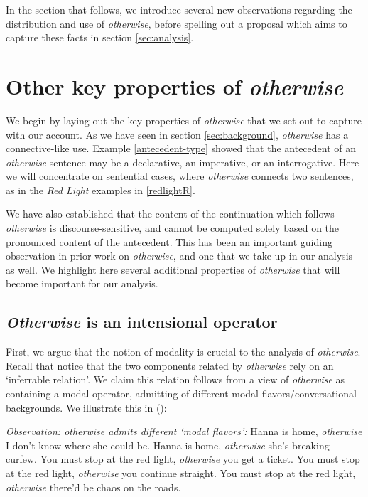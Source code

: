 In the section that follows, we introduce several new observations regarding the distribution and use of \textit{otherwise}, before spelling out a proposal which aims to capture these facts in section \ref{sec:analysis}. 



\section{Other key properties of \textit{otherwise}}
\label{sec:desiderata}


We begin by laying out the key properties of \textit{otherwise} that we set out to capture with our account. As we have seen in section \ref{sec:background}, \textit{otherwise} has a connective-like use. Example \ref{antecedent-type} showed that the antecedent of an \textit{otherwise} sentence may be a declarative, an imperative, or an interrogative. Here we will concentrate on sentential cases, where \textit{otherwise} connects two sentences, as in the \textit{Red Light} examples in \ref{redlightR}. %

We have also established that the content of the continuation which follows \textit{otherwise} is discourse-sensitive, and cannot be computed solely based on the pronounced content of the antecedent. This has been an important guiding observation in prior work on \textit{otherwise}, and one that we take up in our analysis as well. We highlight here several additional properties of \textit{otherwise} that will become important for our analysis.


\subsection{\textit{Otherwise} is an intensional operator} \label{sec:intensional}

First, we argue that the notion of modality is crucial to the analysis of \textit{otherwise}. Recall that \citet{Kruijff-Korbayova2001} notice that the two components related by \textit{otherwise} rely on an `inferrable relation'. We claim this relation follows from a view of \textit{otherwise} as containing a modal operator, admitting of different modal flavors/conversational backgrounds. We illustrate this in (\nextx): 



\pex  \label{modal-flavors}\textit{Observation: \emph{otherwise} admits different `modal flavors':}
\a  \label{epistemic}Hanna is home, \textit{otherwise} I don't know where she could be.  %
\a  \label{deontic}Hanna is home, \textit{otherwise} she's breaking curfew.  %
\a  You must stop at the red light, \textit{otherwise} you get a ticket.
\a  You must stop at the red light, \textit{otherwise} you continue straight.
\a  You must stop at the red light, \textit{otherwise} there'd be chaos on the roads.\xe


